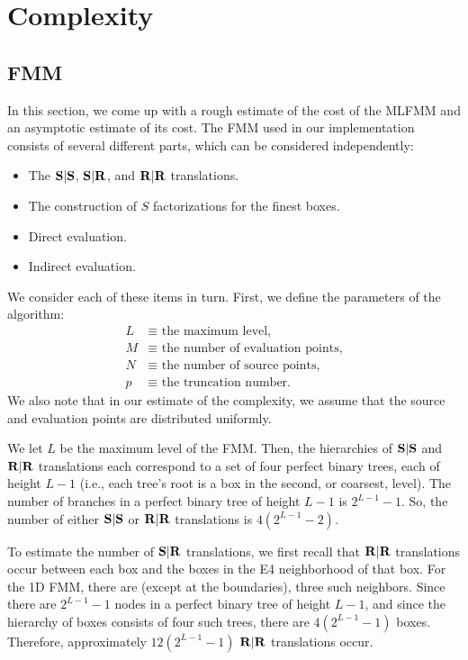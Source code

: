 \section{Complexity}

\subsection{FMM}

In this section, we come up with a rough estimate of the cost of the
MLFMM and an asymptotic estimate of its cost. The FMM used in our
implementation consists of several different parts, which can be
considered independently:
\begin{itemize}
\item The $\bold{S}|\bold{S}$, $\bold{S}|\bold{R}$, and $\bold{R}|\bold{R}$ translations.
\item The construction of $S$ factorizations for the finest boxes.
\item Direct evaluation.
\item Indirect evaluation.
\end{itemize}
We consider each of these items in turn. First, we define the
parameters of the algorithm:
\begin{align*}
L &\equiv \mbox{ the maximum level,} \\
M &\equiv \mbox{ the number of evaluation points,} \\
N &\equiv \mbox{ the number of source points,} \\
p &\equiv \mbox{ the truncation number.}
\end{align*}
We also note that in our estimate of the complexity, we assume that
the source and evaluation points are distributed uniformly.

We let $L$ be the maximum level of the FMM. Then, the hierarchies of
$\bold{S}|\bold{S}$ and $\bold{R}|\bold{R}$ translations each correspond to a set of four
perfect binary trees, each of height $L - 1$ (i.e., each tree's root
is a box in the second, or coarsest, level). The number of branches in
a perfect binary tree of height $L - 1$ is $2^{L-1} - 1$. So, the
number of either $\bold{S}|\bold{S}$ or $\bold{R}|\bold{R}$ translations is
$4(2^{L-1} - 2)$.

To estimate the number of $\bold{S}|\bold{R}$ translations, we first recall that
$\bold{R}|\bold{R}$ translations occur between each box and the boxes in the E4
neighborhood of that box. For the 1D FMM, there are (except at the
boundaries), three such neighbors. Since there are $2^{L-1} - 1$ nodes
in a perfect binary tree of height $L-1$, and since the hierarchy of
boxes consists of four such trees, there are $4(2^{L-1} - 1)$
boxes. Therefore, approximately $12(2^{L-1} - 1)$ $\bold{R}|\bold{R}$
translations occur.

